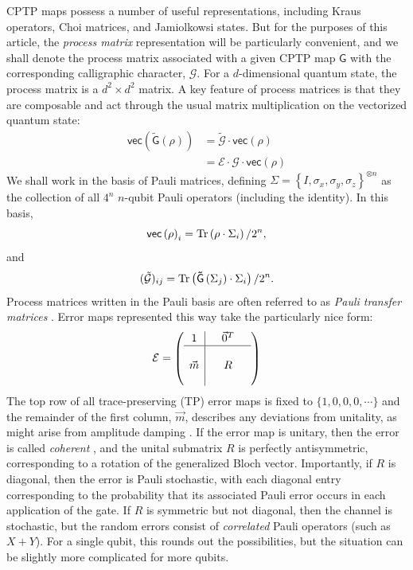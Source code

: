 \documentclass[aps,nofootinbib,pra,notitlepage,twocolumn]{revtex4-1}
\newcommand{\tr}{{\rm Tr\thinspace}}
\newcommand{\vectorize}[1]{\ensuremath{\mathsf{vec}\left(#1\right)}}
\begin{document}
CPTP maps possess a number of useful representations, including Kraus operators\cite{1983}, Choi matrices\cite{Choi1975}, and Jamiolkowsi states\cite{yczkowski2004}. But for the purposes of this article, the \emph{process matrix} representation will be particularly convenient\cite{OBrien2004}, and we shall denote the process matrix associated with a given CPTP map $\mathsf{G}$ with the corresponding calligraphic character, $\mathcal{G}$. For a $d$-dimensional quantum state, the process matrix is a $d^2\times d^2$ matrix. A key feature of process matrices is that they are composable and act through the usual matrix multiplication on the vectorized quantum state:
\begin{align}
	\vectorize{\mathsf{\tilde G}(\rho)}
		&= \mathcal{\tilde G}\cdot\vectorize{\rho} \\
		&= \mathcal{E}\cdot\mathcal{G}\cdot\vectorize{\rho}
\end{align}
We shall work in the basis of Pauli matrices, defining $\Sigma = \left\{I, \sigma_x, \sigma_y, \sigma_z\right\}^{\otimes n}$ as the collection of all $4^n$ $n$-qubit Pauli operators (including the identity).  In this basis,
\begin{equation}
  \vectorize{\rho}_i = \tr\!\left(\rho \cdot\Sigma_i\right)/2^n,
\end{equation}
and
\begin{equation}
	(\mathcal{\tilde G})_{ij} = \tr\!\left(\mathsf{\tilde G}\left(\Sigma_j\right) \cdot\Sigma_i\right)/2^n.
\end{equation}
Process matrices written in the Pauli basis are often referred to as \emph{Pauli transfer matrices} \cite{Chow2012}.  Error maps represented this way take the particularly nice form:
\begin{equation}\label{eq:process_matrix}
\mathcal{E} =
	\left(\begin{array}{c|cccc}
		1 &  & \vec{0}^T & \\ 
		\hline & &  &  \\
		\vec{m} &  & R &  \\
		 &  &  & 
	\end{array} 	
	\right)
\end{equation}
The top row of all trace-preserving (TP) error maps is fixed to $\{1,0,0,0,\cdots\}$ and the remainder of the first column, $\vec{m}$, describes any deviations from unitality, as might arise from amplitude damping \cite{preskill1997lecture}. If the error map is unitary, then the error is called \textit{coherent} , and the unital submatrix $R$ is perfectly antisymmetric, corresponding to a rotation of the generalized Bloch vector. Importantly, if $R$ is diagonal, then the error is Pauli stochastic, with each diagonal entry corresponding to the probability that its associated Pauli error occurs in each application of the gate. If $R$ is symmetric but not diagonal, then the channel is stochastic, but the random errors consist of \emph{correlated} Pauli operators (such as $X+Y$). For a single qubit, this rounds out the possibilities, but the situation can be slightly more complicated for more qubits.
\end{document}
